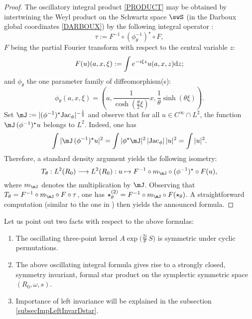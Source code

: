 \begin{proof}
The oscillatory integral product \eqref{PRODUCT} may be obtained by intertwining the Weyl product on the Schwartz space $\swS$ (in the Darboux global coordinates \eqref{DARBOUX}) by the following integral operator \cite{Biel-Massar}:
\begin{equation*}
\tau:=F ^{-1}\circ(\phi_\theta^{-1})^\star\circ F,
\end{equation*}
$F $ being the partial Fourier transform with respect to        the central variable $z$:
\begin{equation*}
F (u)(a,x,\xi):=\int e^{-i\xi z}u(a,x,z){\rm d}z;
\end{equation*}
and $\phi_\theta$ the one parameter family of diffeomorphism(s):
\begin{equation*}
\phi_\theta(a,x,\xi)=(a,\frac{1}{\cosh(\frac{\theta}{2}\xi)}x,
\frac{1}{\theta}\sinh(\theta\xi)).
\end{equation*}
Set $\mJ:=|(\phi^{-1})^\star\mbox{Jac}_\phi|^{-\frac{1}{2}}$ and observe that for all $u\in C^\infty\cap L^2$, the function $\mJ\,(\phi^{-1})^\star u$ belongs to $L^2$.  Indeed, one has
\begin{equation*}
\int|\mJ\,(\phi^{-1})^\star u|^2=\int|\phi^\star \mJ|^2\,|\mbox{Jac}_\phi|\,|u|^2=\int|u|^2.
\end{equation*}
Therefore, a standard density argument yields the following isometry:
\begin{equation*}
T_\theta:L^2(R_0)\longrightarrow L^2(R_0):
u\mapsto F ^{-1}\circ m_\mJ\circ(\phi^{-1})^\star\circ F (u),
\end{equation*}
where  $m_{\mJ}$ denotes the multiplication by $\mJ$.  Observing that $T_\theta=F ^{-1}\circ m_{\mJ}\circ F \circ\tau$, one has $\star^{(2)}_\theta=F ^{-1}\circ m_{\mJ}\circ F (\star_\theta)$.  A straightforward computation (similar to the one in \cite{StrictSolvableSym})     then yields the announced formula.
\end{proof}

Let us point out two facts with respect to the above formulas:
\begin{enumerate}
\item The oscillating three-point kernel $A\exp \big (\frac{2i}{\theta}\,S\big)$ is symmetric under cyclic permutations.
\item The above oscillating integral formula gives rise to a strongly closed, symmetry invariant, formal star product on the symplectic symmetric space $(R_0,\omega,s)$.
\item
    Importance of left invariance will be explained in the subsection \ref{subsecImpLeftInvarDstar}.
\end{enumerate}

